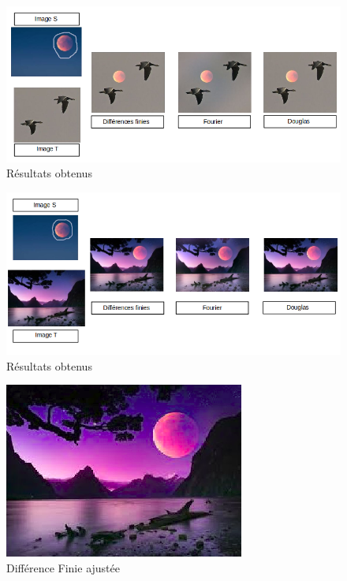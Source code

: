 \begin{figure}[!h]
\centering
\includegraphics[scale=0.5]{Images/Resultats/1.png}
\caption{Résultats obtenus}
\end{figure}

\begin{figure}[!h]
\centering
\includegraphics[scale=0.5]{Images/Resultats/2.png}
\caption{Résultats obtenus}
\end{figure}

\begin{figure}[!h]
\centering
\includegraphics[scale=0.5]{Images/Resultats/LuneDFChangeSel.png}
\caption{Différence Finie ajustée}
\end{figure}


